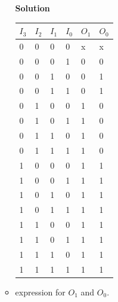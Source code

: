 \begin{enumerate}
\begin{itemize}
                \begin{onlysolution}  \textbf{Solution} \itshape{
                        \begin{tabular}{l|l|l|l||l|l}
                            $I_3$ & $I_2$ & $I_1$ & $I_0$ & $O_1$ & $O_0$ \\ \hline
                            0 & 0 & 0 & 0 &  x & x \\ \hline
                            0 & 0 & 0 & 1 &  0 & 0 \\ \hline
                            0 & 0 & 1 & 0 &  0 & 1 \\ \hline
                            0 & 0 & 1 & 1 &  0 & 1 \\ \hline
                            0 & 1 & 0 & 0 &  1 & 0 \\ \hline
                            0 & 1 & 0 & 1 &  1 & 0 \\ \hline
                            0 & 1 & 1 & 0 &  1 & 0 \\ \hline
                            0 & 1 & 1 & 1 &  1 & 0 \\ \hline
                            1 & 0 & 0 & 0 &  1 & 1 \\ \hline
                            1 & 0 & 0 & 1 &  1 & 1 \\ \hline
                            1 & 0 & 1 & 0 &  1 & 1 \\ \hline
                            1 & 0 & 1 & 1 &  1 & 1 \\ \hline
                            1 & 1 & 0 & 0 &  1 & 1 \\ \hline
                            1 & 1 & 0 & 1 &  1 & 1 \\ \hline
                            1 & 1 & 1 & 0 &  1 & 1 \\ \hline
                            1 & 1 & 1 & 1 &  1 & 1 \\
                        \end{tabular}
                    }
                \end{onlysolution}
            \item \SOPmin expression for $O_1$ and $O_0$.


\end{itemize}
\end{enumerate}
